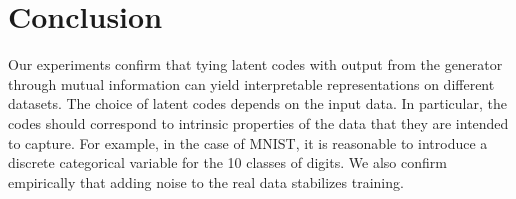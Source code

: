 \documentclass{article}
\newcommand{\e}{\mathbbm{E}}
\begin{document}
\section{Conclusion}
Our experiments confirm that tying latent codes with output from the generator through mutual information can yield interpretable representations on different datasets. The choice of latent codes depends on the input data. In particular, the codes should correspond to intrinsic properties of the data that they are intended to capture. For example, in the case of MNIST, it is reasonable to introduce a discrete categorical variable for the 10 classes of digits. We also confirm empirically that adding noise to the real data stabilizes training. 


\end{document}
